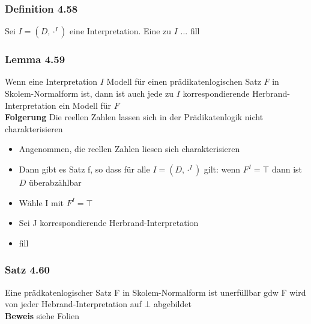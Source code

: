 \subsubsection{Definition 4.58} Sei \(I = (D, \cdot ^I)\) eine Interpretation. Eine zu \(I\) ... fill
\subsubsection{Lemma 4.59} Wenn eine Interpretation \(I\) Modell für einen prädikatenlogischen Satz \(F\) in Skolem-Normalform ist, dann ist auch jede zu \(I\) korrespondierende Herbrand-Interpretation ein Modell für \(F\)\\
\textbf{Folgerung} Die reellen Zahlen lassen sich in der Prädikatenlogik nicht charakterisieren
\begin{itemize}
	\item Angenommen, die reellen Zahlen liesen sich charakterisieren
	\item Dann gibt es Satz f, so dass für alle \(I = (D,\cdot ^I)\) gilt: wenn \(F^I = \top \) dann ist \(D\) überabzählbar
	\item Wähle I mit \(F^I = \top \) 
	\item Sei J korrespondierende Herbrand-Interpretation
	\item fill
\end{itemize}
\subsubsection{Satz 4.60}
Eine prädkatenlogischer Satz F in Skolem-Normalform ist unerfüllbar gdw F wird von jeder Hebrand-Interpretation auf \(\bot\) abgebildet \\
\textbf{Beweis} siehe Folien